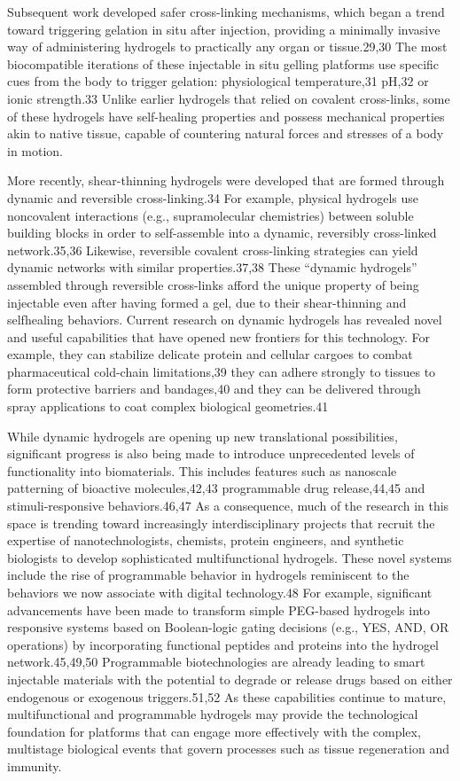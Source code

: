 \documentclass[../../main-notes.tex]{subfiles}
\begin{document}
Subsequent work developed safer cross-linking mechanisms, which began a trend toward triggering gelation in situ after injection, providing a minimally invasive way of administering  hydrogels to practically any organ or tissue.29,30 
The most biocompatible iterations of these injectable in situ gelling platforms use specific cues from the body to trigger gelation:  physiological temperature,31 pH,32 or ionic strength.33 
Unlike earlier hydrogels that relied on covalent cross-links, some of these hydrogels have self-healing properties and possess mechanical properties akin to native tissue, capable of countering natural forces and stresses of a body in motion.


More recently, shear-thinning hydrogels were developed that are formed through dynamic and reversible cross-linking.34 
For example, physical hydrogels use noncovalent interactions (e.g., supramolecular chemistries) between soluble building blocks in order to self-assemble into a dynamic, reversibly cross-linked  network.35,36 
Likewise, reversible covalent cross-linking strategies can yield dynamic networks with similar properties.37,38 
These “dynamic hydrogels” assembled through reversible cross-links afford the unique property of being injectable even after having formed a gel, due to their shear-thinning and selfhealing behaviors. 
Current research on dynamic hydrogels has revealed novel and useful capabilities that have opened new frontiers for this technology. 
For example, they can stabilize delicate protein and cellular cargoes to combat pharmaceutical  cold-chain limitations,39 they can adhere strongly to tissues to  form protective barriers and bandages,40 and they can be delivered through spray applications to coat complex biological  geometries.41


While dynamic hydrogels are opening up new translational possibilities, significant progress is also being made to introduce unprecedented levels of functionality into biomaterials. 
This includes features such as nanoscale patterning of  bioactive molecules,42,43 programmable drug release,44,45 and  stimuli-responsive behaviors.46,47 
As a consequence, much of the research in this space is trending toward increasingly interdisciplinary projects that recruit the expertise of nanotechnologists, chemists, protein engineers, and synthetic biologists to develop sophisticated multifunctional hydrogels. 
These novel systems include the rise of programmable behavior in hydrogels reminiscent to the behaviors we now  associate with digital technology.48 
For example, significant advancements have been made to transform simple PEG-based hydrogels into responsive systems based on Boolean-logic gating decisions (e.g., YES, AND, OR operations) by incorporating functional peptides and proteins into the  hydrogel network.45,49,50 
Programmable biotechnologies are already leading to smart injectable materials with the potential to degrade or release drugs based on either endogenous or  exogenous triggers.51,52 
As these capabilities continue to mature, multifunctional and programmable hydrogels may provide the technological foundation for platforms that can engage more effectively with the complex, multistage biological events that govern processes such as tissue regeneration and immunity.
\end{document}
